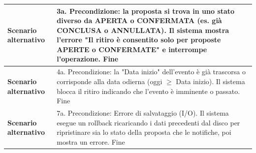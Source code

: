 \documentclass[12pt, a4paper, oneside]{report}
\begin{document}
\begin{tabularx}{\textwidth}{|l|X|}
    \textbf{Scenario alternativo} & 
    3a. Precondizione: la proposta si trova in uno stato diverso da APERTA o CONFERMATA (es. già CONCLUSA o ANNULLATA).\newline
    Il sistema mostra l'errore "Il ritiro è consentito solo per proposte APERTE o CONFERMATE" e interrompe l'operazione. \newline
    Fine \\ \hline

    \textbf{Scenario alternativo} & 
    4a. Precondizione: la "Data inizio" dell'evento è già trascorsa o corrisponde alla data odierna (oggi $\ge$ Data inizio).\newline
    Il sistema blocca il ritiro indicando che l'evento è imminente o passato. \newline
    Fine \\ \hline

    \textbf{Scenario alternativo} & 
    7a. Precondizione: Errore di salvataggio (I/O).\newline
    Il sistema esegue un rollback ricaricando i dati precedenti dal disco per ripristinare sia lo stato della proposta che le notifiche, poi mostra un errore. \newline
    Fine \\ \hline
\end{tabularx}

\renewcommand{\arraystretch}{1.4} 
\end{document}

